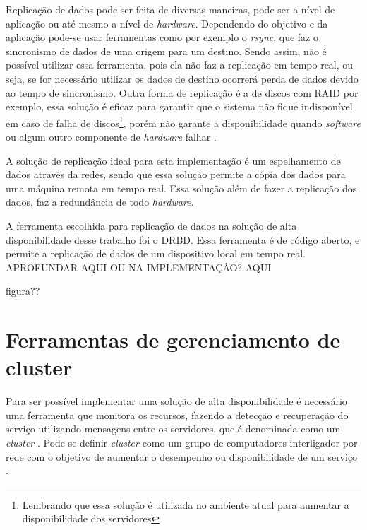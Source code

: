 Replicação de dados pode ser feita de diversas maneiras, pode ser a nível de aplicação ou até mesmo a nível de \textit{hardware}.
Dependendo do objetivo e da aplicação pode-se usar ferramentas como por exemplo o \textit{rsync}, que faz o sincronismo de dados de uma origem
para um destino. Sendo assim, não é possível utilizar essa ferramenta, pois ela não faz a replicação em tempo real, ou seja, se for necessário
utilizar os dados de destino ocorrerá perda de dados devido ao tempo de sincronismo. Outra forma de replicação é a de discos com \ac{RAID} 
por exemplo, essa solução é eficaz para garantir que o sistema não fique indisponível em caso de falha de discos\footnote{Lembrando que essa 
solução é utilizada no ambiente atual para aumentar a disponibilidade dos servidores}, porém não garante a disponibilidade quando \textit{software}
ou algum outro componente de \textit{hardware} falhar \cite{zaminhani2008}.

A solução de replicação ideal para esta implementação é um espelhamento de dados através da redes, sendo que essa solução permite a cópia dos 
dados para uma máquina remota em tempo real. Essa solução além de fazer a replicação dos dados, faz a redundância de todo \textit{hardware}.

A ferramenta escolhida para replicação de dados na solução de alta disponibilidade desse trabalho foi o \ac{DRBD}. Essa ferramenta é de código
aberto, e permite a replicação de dados de um dispositivo local em tempo real. 
APROFUNDAR AQUI OU NA IMPLEMENTAÇÂO? AQUI

figura??


\section{Ferramentas de gerenciamento de cluster}
\label{section:toolcluster}

Para ser possível implementar uma solução de alta disponibilidade é necessário uma ferramenta que monitora os recursos, fazendo a detecção e
recuperação do serviço utilizando mensagens entre os servidores, que é denominada como um \textit{cluster} \cite{perkov2011}. 
Pode-se definir \textit{cluster} como um grupo de computadores interligador por rede com o objetivo de aumentar o desempenho ou disponibilidade
de um serviço \cite{freitas2005}.

